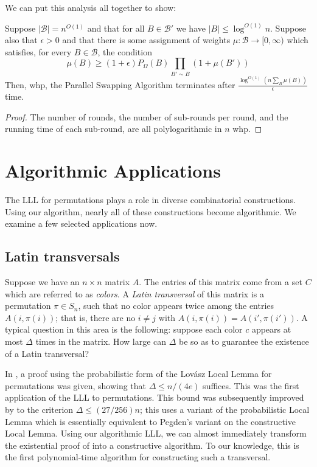 We can put this analysis all together to show:

\begin{theorem}
\label{parallel-thm}
Suppose $|\mathcal B| = n^{O(1)}$ and that for all $B \in \mathcal B'$ we have $|B| \leq \log^{O(1)} n$. Suppose also that $\epsilon > 0$ and that there is some assignment of weights $\mu: \mathcal B \rightarrow [0, \infty)$ which satisfies, for every $B \in \mathcal B$, the condition
$$
\mu(B) \geq (1 +\epsilon) P_{\Omega}(B) \prod_{B' \sim B} (1 + \mu(B'))
$$
Then, whp, the Parallel Swapping Algorithm terminates after $\frac{\log^{O(1)} (n \sum_B \mu(B)) }{\epsilon}$ time.
\end{theorem}
\begin{proof}
The number of rounds, the number of sub-rounds per round, and the running time of each sub-round, are all polylogarithmic in $n$ whp.
\end{proof}

\section{Algorithmic Applications}
\label{alg-sec}
The LLL for permutations plays a role in diverse combinatorial constructions. Using our algorithm, nearly all of these constructions become algorithmic.  We examine a few selected applications now. 


\subsection{Latin transversals}
Suppose we have an $n \times n$ matrix $A$. The entries of this matrix come from a set $C$ which are referred to as \emph{colors}. A \emph{Latin transversal} of this matrix is a permutation $\pi \in S_n$, such that no color appears twice among the entries $A(i, \pi(i))$; that is, there are no $i \neq j$ with $A(i, \pi(i)) = A(i', \pi(i'))$. A typical question in this area is the following: suppose each color $c$ appears at most $\Delta$ times in the matrix. How large can $\Delta$ be so as to guarantee the existence of a Latin transversal?

In \cite{erdos-spencer}, a proof using the probabilistic form of the Lov\'{a}sz Local Lemma for permutations was given, showing that $\Delta \leq n/(4e)$ suffices. This was the first application of the LLL to permutations. This bound was subsequently improved by \cite{bissacot} to the criterion $\Delta \leq (27/256) n$; this uses a variant of the probabilistic Local Lemma which is essentially equivalent to Pegden's variant on the constructive Local Lemma.
Using our algorithmic LLL, we can almost immediately transform the existential proof of \cite{bissacot} into a constructive algorithm. To our knowledge, this is the first polynomial-time algorithm for constructing such a transversal.

